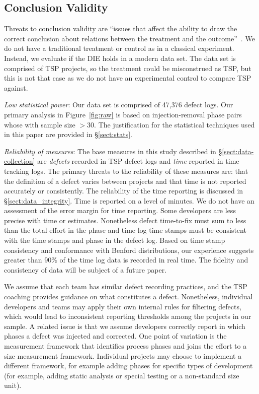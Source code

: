 \documentclass[smallcondensed]{svjour3}
\newcommand{\tion}[1]{\S\ref{sect:#1}}
\newcommand{\fig}[1]{Figure~\ref{fig:#1}}
\begin{document}
\subsection{Conclusion Validity}
\label{sect:conclusion_validity}
Threats to conclusion validity are ``issues that affect the ability to draw the correct conclusion about relations between the treatment and the outcome''~\cite{wohlin2012}. We do not have a traditional treatment or control as in a classical experiment. Instead, we evaluate if the DIE holds in a modern data set. The data set is comprised of TSP projects, so the treatment could be misconstrued as TSP, but this is not that case as we do not have an experimental control to compare TSP against. 

\textit{Low statistical power}: Our data set is comprised of 47,376 defect logs. Our primary analysis in \fig{raw} is based on injection-removal phase pairs whose with sample size $>30$. The justification for the statistical techniques used in this paper are provided in \tion{stats}.

\textit{Reliability of measures}: The base measures in this study described in \tion{data-collection} are \textit{defects} recorded in TSP defect logs and \textit{time} reported in time tracking logs. The primary threats to the reliability of these measures are: that the definition of a defect varies between projects and that time is not reported accurately or consistently. The reliability of the time reporting is discussed in \tion{data_integrity}. Time is reported on a level of minutes. We do not have an assessment of the error margin for time reporting. Some developers are less precise with time or estimates. Nonetheless defect time-to-fix must sum to less than the total effort in the phase and time log time stamps must be consistent with the time stamps and phase in the defect log. Based on time stamp consistency and conformance with Benford distributions, our experience suggests greater than 90\% of the time log data is recorded in real time. The fidelity and consistency of data will be subject of a future paper. 

We assume that each team has similar defect recording practices, and the TSP coaching provides guidance on what constitutes a defect. Nonetheless, individual developers and teams may apply their own internal rules for filtering defects, which would lead to inconsistent reporting thresholds among the projects in our sample. A related issue is that we assume developers correctly report in which phases a defect was injected and corrected. One point of variation is the measurement framework that identifies process phases and joins the effort to a size measurement framework. Individual projects may choose to implement a different framework, for example adding phases for specific types of development (for example, adding static analysis or special testing or a non-standard size unit).  
\end{document}
